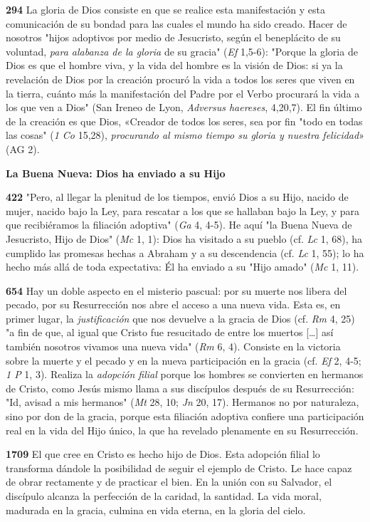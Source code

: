 \documentclass[]{article}
\begin{document}
\textbf{294} La gloria de Dios consiste en que se realice esta
manifestación y esta comunicación de su bondad para las cuales el mundo
ha sido creado. Hacer de nosotros "hijos adoptivos por medio de
Jesucristo, según el beneplácito de su voluntad, \emph{para alabanza de
la gloria} de su gracia" (\emph{Ef} 1,5-6): "Porque la gloria de Dios es
que el hombre viva, y la vida del hombre es la visión de Dios: si ya la
revelación de Dios por la creación procuró la vida a todos los seres que
viven en la tierra, cuánto más la manifestación del Padre por el Verbo
procurará la vida a los que ven a Dios" (San Ireneo de Lyon,
\emph{Adversus haereses}, 4,20,7). El fin último de la creación es que
Dios, «Creador de todos los seres, sea por fin "todo en todas las cosas"
(\emph{1 Co} 15,28), \emph{procurando al mismo tiempo su gloria y
nuestra felicidad}» (AG 2).

\textbf{La Buena Nueva: Dios ha enviado a su Hijo}

\textbf{422} "Pero, al llegar la plenitud de los tiempos, envió Dios a
su Hijo, nacido de mujer, nacido bajo la Ley, para rescatar a los que se
hallaban bajo la Ley, y para que recibiéramos la filiación adoptiva"
(\emph{Ga} 4, 4-5). He aquí "la Buena Nueva de Jesucristo, Hijo de Dios"
(\emph{Mc} 1, 1): Dios ha visitado a su pueblo (cf. \emph{Lc} 1, 68), ha
cumplido las promesas hechas a Abraham y a su descendencia (cf.
\emph{Lc} 1, 55); lo ha hecho más allá de toda expectativa: Él ha
enviado a su "Hijo amado" (\emph{Mc} 1, 11).

\textbf{654} Hay un doble aspecto en el misterio pascual: por su muerte
nos libera del pecado, por su Resurrección nos abre el acceso a una
nueva vida. Esta es, en primer lugar, la \emph{justificación} que nos
devuelve a la gracia de Dios (cf. \emph{Rm} 4, 25) "a fin de que, al
igual que Cristo fue resucitado de entre los muertos [\ldots{}] así
también nosotros vivamos una nueva vida" (\emph{Rm} 6, 4). Consiste en
la victoria sobre la muerte y el pecado y en la nueva participación en
la gracia (cf. \emph{Ef} 2, 4-5; \emph{1 P} 1, 3). Realiza la
\emph{adopción filial} porque los hombres se convierten en hermanos de
Cristo, como Jesús mismo llama a sus discípulos después de su
Resurrección: "Id, avisad a mis hermanos" (\emph{Mt} 28, 10; \emph{Jn}
20, 17). Hermanos no por naturaleza, sino por don de la gracia, porque
esta filiación adoptiva confiere una participación real en la vida del
Hijo único, la que ha revelado plenamente en su Resurrección.

\textbf{1709} El que cree en Cristo es hecho hijo de Dios. Esta adopción
filial lo transforma dándole la posibilidad de seguir el ejemplo de
Cristo. Le hace capaz de obrar rectamente y de practicar el bien. En la
unión con su Salvador, el discípulo alcanza la perfección de la caridad,
la santidad. La vida moral, madurada en la gracia, culmina en vida
eterna, en la gloria del cielo.
\end{document}
